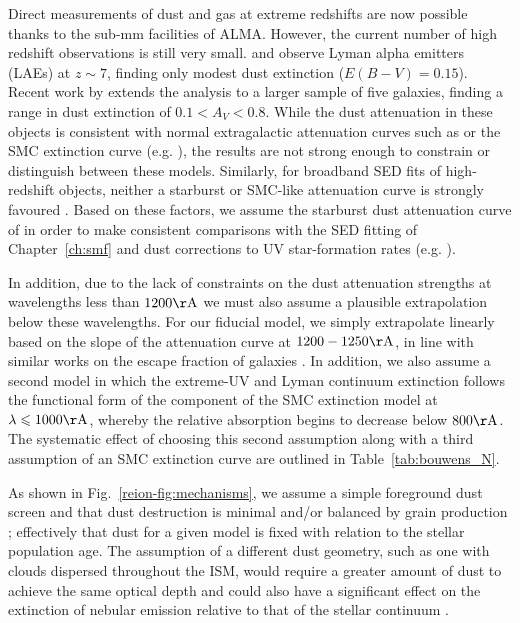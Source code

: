 Direct measurements of dust and gas at extreme redshifts are now possible thanks to the sub-mm facilities of ALMA. However, the current number of high redshift observations is still very small. \citet{2013ApJ...778..102O} and \citet{Ota:2014du} observe Lyman alpha emitters (LAEs) at $z\sim7$, finding only modest dust extinction ($E(B-V) = 0.15$). Recent work by \citet{2015A&A...574A..19S} extends the analysis to a larger sample of five galaxies, finding a range in dust extinction of $0.1 < A_{V} < 0.8$. While the dust attenuation in these objects is consistent with normal extragalactic attenuation curves such as \citep{2000ApJ...533..682C} or the SMC extinction curve (e.g. \citet{Pei:1992ey}), the results are not strong enough to constrain or distinguish between these models. Similarly, for broadband SED fits of high-redshift objects, neither a starburst or SMC-like attenuation curve is strongly favoured \citep{2015ApJ...799..183S}. Based on these factors, we assume the starburst dust attenuation curve of \citet{2000ApJ...533..682C} in order to make consistent comparisons with the SED fitting of Chapter~\ref{ch:smf} and \citet{Meurer:1999jm} dust corrections to UV star-formation rates (e.g. \citet{Bouwens:2011tj,Smit:2012is}). 

In addition, due to the lack of constraints on the dust attenuation strengths at wavelengths less than $1200\rm{\AA}$ we must also assume a plausible extrapolation below these wavelengths. For our fiducial model, we simply extrapolate linearly based on the slope of the attenuation curve at $1200-1250 \rm{\AA}$, in line with similar works on the escape fraction of galaxies \citep{Siana:2007bc}. In addition, we also assume a second model in which the extreme-UV and Lyman continuum extinction follows the functional form of the component of the \citet{Pei:1992ey} SMC extinction model at $\lambda \leq 1000 \rm{\AA}$, whereby the relative absorption begins to decrease below $800\rm{\AA}$. The systematic effect of choosing this second assumption along with a third assumption of an SMC extinction curve are outlined in Table~\ref{tab:bouwens_N}.

As shown in Fig.~\ref{reion-fig:mechanisms}, we assume a simple foreground dust screen \citep{1994ApJ...429..582C} and that dust destruction is minimal and/or balanced by grain production \citep{Zafar:2013fe,Rowlands:2014dq}; effectively that dust for a given model is fixed with relation to the stellar population age. The assumption of a different dust geometry, such as one with clouds dispersed throughout the ISM, would require a greater amount of dust to achieve the same optical depth and could also have a significant effect on the extinction of nebular emission relative to that of the stellar continuum \citep{Zackrisson:2013iz}.

